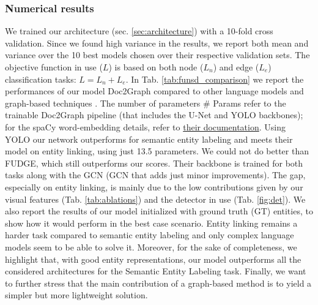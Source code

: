 \documentclass[runningheads]{llncs}
\begin{document}
\subsubsection{Numerical results}
We trained our architecture (sec. \ref{sec:architecture}) with a 10-fold cross validation. Since we found high variance in the results, we report both mean and variance over the 10 best models chosen over their respective validation sets. The objective function in use ($L$) is based on both node ($L_n$) and edge ($L_e$) classification tasks: $L = L_n + L_e$.
In Tab. \ref{tab:funsd_comparison} we report the performances of our model Doc2Graph compared to other language models \cite{hong2020bros,xu2020layoutlm} and graph-based techniques \cite{carbonell2021named,davis2021visual}. The number of parameters \# Params refer to the trainable Doc2Graph pipeline (that includes the U-Net and YOLO backbones); for the spaCy word-embedding details, refer to \href{https://spacy.io/models/en\#en_core_web_lg}{their documentation}. Using YOLO our network outperforms \cite{carbonell2021named} for semantic entity labeling and meets their model on entity linking, using just 13.5 parameters. We could not do better than FUDGE, which still outperforms our scores. Their backbone is trained for both tasks along with the GCN (GCN that adds just minor improvements). The gap, especially on entity linking, is mainly due to the low contributions given by our visual features (Tab. \ref{tab:ablations}) and the detector in use (Tab. \ref{fig:det}).
We also report the results of our model initialized with ground truth (GT) entities, to show how it would perform in the best case scenario. Entity linking remains a harder task compared to semantic entity labeling and only complex language models seem to be able to solve it. Moreover, for the sake of completeness, we highlight that, with good entity representations, our model outperforms all the considered architectures for the Semantic Entity Labeling task. Finally, we want to further stress that the main contribution of a graph-based method is to yield a simpler but more lightweight solution.
\end{document}
